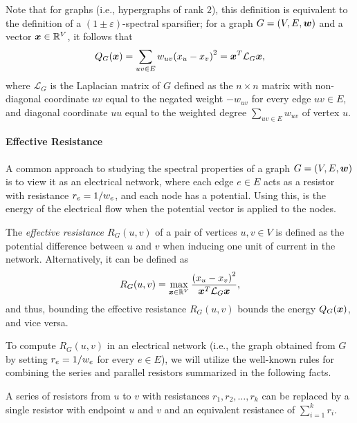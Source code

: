 Note that for graphs (i.e., hypergraphs of rank \( 2 \)), this definition is equivalent to the definition of a \( (1 \pm \varepsilon) \)-spectral sparsifier; for a graph \( G = (V, E, \boldsymbol{w}) \) and a vector \( \boldsymbol{x} \in \mathbb R ^{V} \), it follows that
\begin{equation} \label{eq:quadratic}
Q _G (\vect{x}) = \sum_{ uv \in E} \w{uv} \left( \x{u} - \x{v} \right)^2 = \vect{x}^T \mathcal L _G \vect{x},
\end{equation}
where \( \mathcal L _G
\) is the Laplacian matrix of \( G \) defined as the \( n \times n \) matrix with non-diagonal coordinate \( uv \) equal to the negated weight \( - w_{uv} \) for every edge \( uv \in E \), and diagonal coordinate \( uu \) equal to the weighted degree \( \sum _{uv \in E} w_{uv} \) of vertex \( u \).


\paragraph{Effective Resistance}
A common approach to studying the spectral properties of a graph \( G = (V, E, \boldsymbol{w}) \) is to view it as an electrical network, where each edge \( e \in E \) acts as a resistor with resistance \(  r_{e}  = 1 /  w_{e}  \), and each node has a potential.
Using this,  is the energy of the electrical flow when the potential vector  is applied to the nodes. 

The \textit{effective resistance \( R_G(u, v) \)} of a pair of vertices \( u, v \in V \) is defined as the potential difference between \( u \) and \( v \) when inducing one unit of current in the network.
Alternatively, it can be defined as 
\begin{equation*}
R_G(u, v) = \max_{\vect{x} \in \mathbb R ^{V}} \frac{\left( \x{u} - \x{v} \right)^2}{\vect{x}^T \mathcal L_G \vect{x}},
\end{equation*}
and thus, bounding the effective resistance \( R_G(u, v) \) bounds the energy \( Q_G(\boldsymbol{x}) \), and vice versa. 

To compute \( R_G(u, v) \) in an electrical network (i.e., the graph obtained from \( G \) by setting \(  r_{e}  = 1 /  w_{e}  \) for every \( e \in E \)), we will utilize the well-known rules for combining the series and parallel resistors summarized in the following facts.


\begin{fact}
A series of resistors from \( u \) to \( v \) with resistances \( r_1, r_2, \dots, r_k \) can be replaced by a single resistor with endpoint \( u \) and \( v \) and an equivalent resistance of \( \sum_{i = 1} ^k r_i \).
\end{fact}

